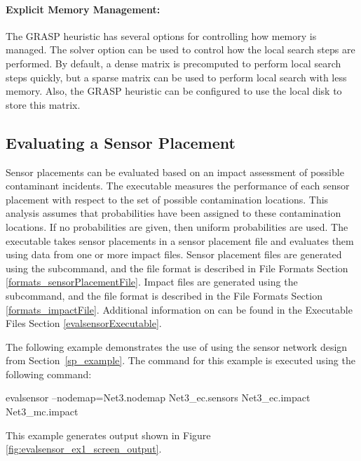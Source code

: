 \paragraph{Explicit Memory Management:}
The GRASP heuristic has several options for controlling how memory 
is managed. The  solver option can be used to 
control how the local search steps are performed. By default, a dense matrix is 
precomputed to perform local search steps quickly, but a sparse matrix can be 
used to perform local search with less memory. Also, the GRASP heuristic can be 
configured to use the local disk to store this matrix.


\subsection{Evaluating a Sensor Placement}\label{solvers_solvers6}

Sensor placements can be evaluated based on an impact assessment of possible contaminant incidents.  
The  executable measures the performance of each sensor placement
with respect to the set of possible contamination locations. This analysis
assumes that probabilities have been assigned to these contamination
locations. If no probabilities are given, then uniform probabilities
are used. The  executable takes sensor placements in a sensor placement 
file and evaluates them using data from one or more impact files.
Sensor placement files are generated using the  subcommand, and the file format is described 
in File Formats Section \ref{formats_sensorPlacementFile}. Impact files 
are generated using the  subcommand, and the file format is described 
in the File Formats Section \ref{formats_impactFile}. Additional information on 
 can be found in the Executable Files Section \ref{evalsensorExecutable}.

The following example demonstrates the use of  using the sensor 
network design from Section~\ref{sp_example}.
The  command for this example is executed using the following command:

\begin{unknownListing}
evalsensor --nodemap=Net3.nodemap Net3_ec.sensors Net3_ec.impact Net3_mc.impact
\end{unknownListing}

This example generates output shown in Figure \ref{fig:evalsensor_ex1_screen_output}.

